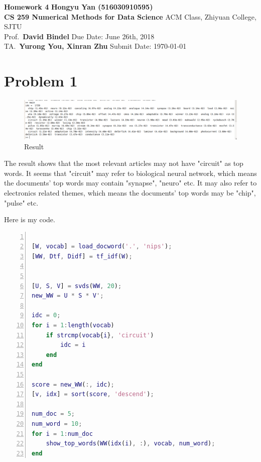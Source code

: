 \documentclass[a4paper, 11pt]{article}
\begin{document}
\noindent
\large\textbf{Homework 4} \hfill \textbf{Hongyu Yan (516030910595)} \\
\normalsize {\bf CS 259 Numerical Methods for Data Science} \hfill ACM Class, Zhiyuan College, SJTU\\
Prof.~{\bf David Bindel} \hfill Due Date: June 26th, 2018\\
TA.~{\bf Yurong You, Xinran Zhu} \hfill Submit Date: \today

\section*{Problem 1}

\begin{figure}[htbp]
\centering
	\includegraphics[scale=0.4]{result.png}
	\caption{Result}
	\label{fig1}
\end{figure}
The result shows that the most relevant articles may not have "circuit" as top words.
It seems that "circuit" may refer to biological neural network, which means the documents'
top words may contain "synapse", "neuro" etc.
It may also refer to electronics related themes, which means the documents' top words may be "chip", "pulse" etc.

Here is my code.

\begin{lstlisting}[language = Matlab, numbers=left,   
  numberstyle=\tiny,keywordstyle=\color{blue!70},  
  commentstyle=\color{red!50!green!50!blue!50},frame=shadowbox,  
  rulesepcolor=\color{red!20!green!20!blue!20},basicstyle=\ttfamily,
  tabsize=2]

[W, vocab] = load_docword('.', 'nips');
[WW, Dtf, Didf] = tf_idf(W);


[U, S, V] = svds(WW, 20);
new_WW = U * S * V';

idc = 0;
for i = 1:length(vocab)
	if strcmp(vocab{i}, 'circuit')
		idc = i
	end
end

score = new_WW(:, idc);
[v, idx] = sort(score, 'descend');

num_doc = 5;
num_word = 10;
for i = 1:num_doc
	show_top_words(WW(idx(i), :), vocab, num_word);
end

\end{lstlisting}
\end{document}
